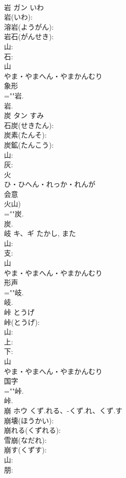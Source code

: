 \documentclass[8pt]{extreport}
\begin{document}
\begin{CJK}{UTF8}{min}
\\	岩	ガン	いわ		
\\	岩(いわ): 
\\	溶岩(ようがん): 
\\	岩石(がんせき): 
\\	山: 
\\	石: 
\\	山	
\\	やま・やまへん・やまかんむり	
\\	象形 
\\	=""岩.
\\	岩.
\\	炭	タン	すみ		
\\	石炭(せきたん): 
\\	炭素(たんそ): 
\\	炭鉱(たんこう): 
\\	山: 
\\	灰: 
\\	火	
\\	ひ・ひへん・れっか・れんが	
\\	会意 
\\	火山) 
\\	=""炭.
\\	炭.
\\	岐	キ、ギ		たかし, また	
\\	山: 
\\	支: 
\\	山	
\\	やま・やまへん・やまかんむり	
\\	形声 
\\	=""岐.
\\	岐.
\\	峠		とうげ		
\\	峠(とうげ): 
\\	山: 
\\	上: 
\\	下: 
\\	山	
\\	やま・やまへん・やまかんむり	
\\	国字 
\\	=""峠.
\\	峠.
\\	崩	ホウ	くず.れる、-くず.れ、くず.す		
\\	崩壊(ほうかい): 
\\	崩れる(くずれる): 
\\	雪崩(なだれ): 
\\	崩す(くずす): 
\\	山: 
\\	朋: 

\end{CJK}
\end{document}
